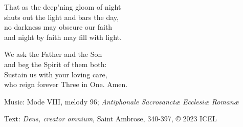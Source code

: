 \hymn



\begin{underhymnverse}
That as the deep’ning gloom of night\\
shuts out the light and bars the day,\\
no darkness may obscure our faith\\
and night by faith may fill with light.

We ask the Father and the Son\\
and beg the Spirit of them both:\\
Sustain us with your loving care,\\
who reign forever Three in One. Amen.
\end{underhymnverse}

\begin{hymnsource}
Music: Mode VIII, melody 96; \emph{Antiphonale Sacrosanctæ Ecclesiæ Romanæ}

Text: \emph{Deus, creator omnium}, Saint Ambrose, 340-397, © 2023 ICEL
\end{hymnsource}

